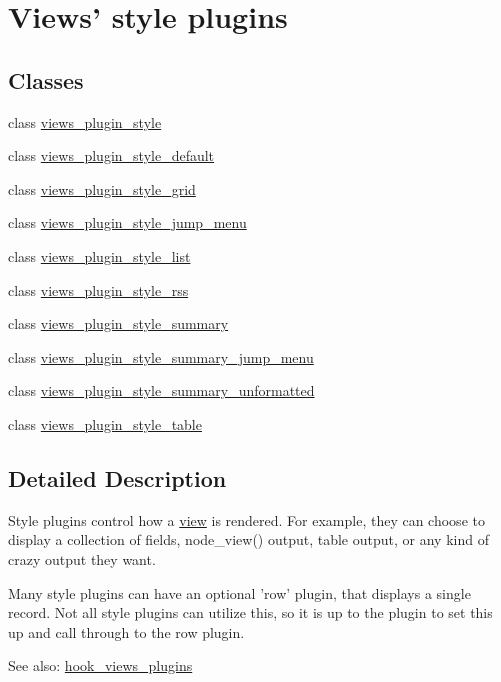 \hypertarget{group__views__style__plugins}{
\section{Views' style plugins}
\label{group__views__style__plugins}
}
\subsection*{Classes}
\begin{CompactItemize}
\item 
class \hyperlink{classviews__plugin__style}{views\_\-plugin\_\-style}
\item 
class \hyperlink{classviews__plugin__style__default}{views\_\-plugin\_\-style\_\-default}
\item 
class \hyperlink{classviews__plugin__style__grid}{views\_\-plugin\_\-style\_\-grid}
\item 
class \hyperlink{classviews__plugin__style__jump__menu}{views\_\-plugin\_\-style\_\-jump\_\-menu}
\item 
class \hyperlink{classviews__plugin__style__list}{views\_\-plugin\_\-style\_\-list}
\item 
class \hyperlink{classviews__plugin__style__rss}{views\_\-plugin\_\-style\_\-rss}
\item 
class \hyperlink{classviews__plugin__style__summary}{views\_\-plugin\_\-style\_\-summary}
\item 
class \hyperlink{classviews__plugin__style__summary__jump__menu}{views\_\-plugin\_\-style\_\-summary\_\-jump\_\-menu}
\item 
class \hyperlink{classviews__plugin__style__summary__unformatted}{views\_\-plugin\_\-style\_\-summary\_\-unformatted}
\item 
class \hyperlink{classviews__plugin__style__table}{views\_\-plugin\_\-style\_\-table}
\end{CompactItemize}


\subsection{Detailed Description}
Style plugins control how a \hyperlink{classview}{view} is rendered. For example, they can choose to display a collection of fields, node\_\-view() output, table output, or any kind of crazy output they want.

Many style plugins can have an optional 'row' plugin, that displays a single record. Not all style plugins can utilize this, so it is up to the plugin to set this up and call through to the row plugin.

\begin{Desc}
\item[See also:]\hyperlink{group__views__hooks_g23f6e9972b2ed84fc54b7ff63f44477d}{hook\_\-views\_\-plugins} \end{Desc}
